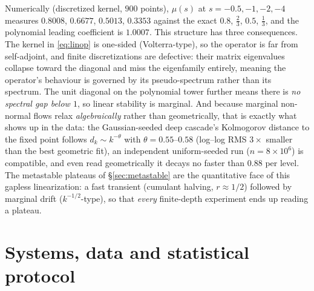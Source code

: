 \documentclass[11pt,a4paper]{article}
\theoremstyle{remark}
\begin{document}
Numerically (discretized kernel, $900$ points), $\mu(s)$ at $s = -0.5, -1, -2, -4$ measures
$0.8008$, $0.6677$, $0.5013$, $0.3353$ against the exact $0.8$, $\tfrac23$, $0.5$, $\tfrac13$, and
the polynomial leading coefficient is $1.0007$. This structure has three consequences. The kernel in
\eqref{eq:linop} is one-sided (Volterra-type), so the operator is far from self-adjoint, and finite
discretizations are defective: their matrix eigenvalues collapse toward the diagonal and miss the
eigenfamily entirely, meaning the operator's behaviour is governed by its pseudo-spectrum rather than
its spectrum. The unit diagonal on the polynomial tower further means there is \emph{no spectral gap
below $1$}, so linear stability is marginal. And because marginal non-normal flows relax
\emph{algebraically} rather than geometrically, that is exactly what shows up in the data: the
Gaussian-seeded deep cascade's Kolmogorov distance to the fixed point follows $d_k \sim k^{-\theta}$
with $\theta = 0.55$--$0.58$ (log--log RMS $3\times$ smaller than the best geometric fit), an
independent uniform-seeded run ($n = 8\times10^{6}$) is compatible, and even read geometrically it
decays no faster than $0.88$ per level. The metastable plateaus of \S\ref{sec:metastable} are the
quantitative face of this gapless linearization: a fast transient (cumulant halving, $r \approx 1/2$)
followed by marginal drift ($k^{-1/2}$-type), so that \emph{every} finite-depth experiment ends up
reading a plateau.

\section{Systems, data and statistical protocol}\label{sec:protocols}
\end{document}
